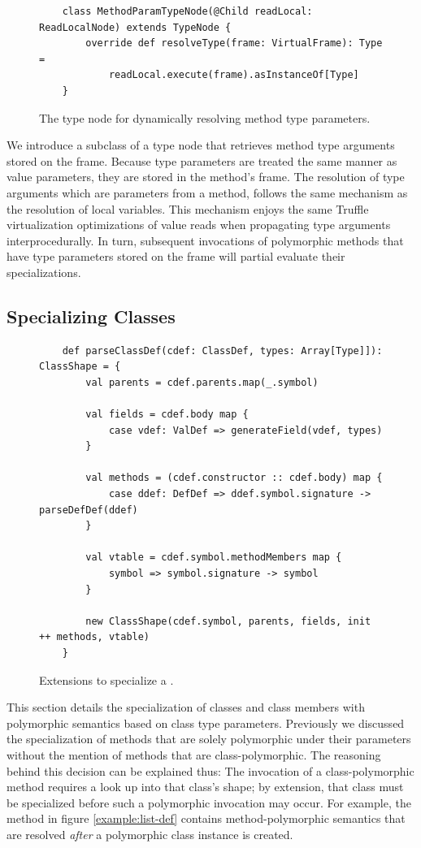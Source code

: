 \begin{figure}[!htb]
	\begin{verbatim}
	class MethodParamTypeNode(@Child readLocal: ReadLocalNode) extends TypeNode {
		override def resolveType(frame: VirtualFrame): Type = 
			readLocal.execute(frame).asInstanceOf[Type]
	}
	\end{verbatim}
	\caption{The type node for dynamically resolving method type parameters.}
	\label{impl:method-param-typenode}
\end{figure}

We introduce a subclass of a type node that retrieves method type arguments stored on the frame.
Because type parameters are treated the same manner as value parameters, they are stored in the method's frame.
The resolution of type arguments which are parameters from a method, follows the same mechanism as the resolution of local variables.
This mechanism enjoys the same Truffle virtualization optimizations of value reads when propagating type arguments interprocedurally.
In turn, subsequent invocations of polymorphic methods that have type parameters stored on the frame will partial evaluate their specializations.

\subsection{Specializing Classes}

\begin{figure}[!htb]
	\begin{verbatim}
	def parseClassDef(cdef: ClassDef, types: Array[Type]]): ClassShape = {
		val parents = cdef.parents.map(_.symbol)
			
		val fields = cdef.body map {
			case vdef: ValDef => generateField(vdef, types)	
		}
		
		val methods = (cdef.constructor :: cdef.body) map {
			case ddef: DefDef => ddef.symbol.signature -> parseDefDef(ddef)
		}
			
		val vtable = cdef.symbol.methodMembers map {
			symbol => symbol.signature -> symbol
		}
			
		new ClassShape(cdef.symbol, parents, fields, init ++ methods, vtable)
	}
	\end{verbatim}
	\caption{Extensions to specialize a .}
	\label{impl:specialize-class}
\end{figure}

This section details the specialization of classes and class members with polymorphic semantics based on class type parameters.
Previously we discussed the specialization of methods that are solely polymorphic under their parameters without the mention of methods that are class-polymorphic.
The reasoning behind this decision can be explained thus: The invocation of a class-polymorphic method requires a look up into that class's shape; by extension, that class must be specialized before such a polymorphic invocation may occur.
For example, the method  in figure \ref{example:list-def} contains method-polymorphic semantics that are resolved \textit{after} a polymorphic class instance is created.

